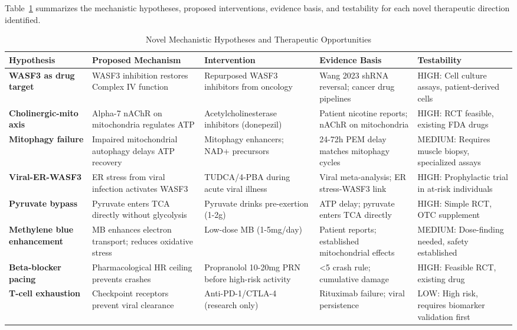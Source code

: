 Table~\ref{tab:novel-hypotheses-summary} summarizes the mechanistic hypotheses, proposed interventions, evidence basis, and testability for each novel therapeutic direction identified.

\begin{table}[htbp]
\centering
\caption{Novel Mechanistic Hypotheses and Therapeutic Opportunities}
\label{tab:novel-hypotheses-summary}
\scriptsize
\begin{tabular}{p{2.8cm}p{3cm}p{2.8cm}p{2.5cm}p{2.5cm}}
\toprule
\textbf{Hypothesis} & \textbf{Proposed Mechanism} & \textbf{Intervention} & \textbf{Evidence Basis} & \textbf{Testability} \\
\midrule
\textbf{WASF3 as drug target} & WASF3 inhibition restores Complex IV function & Repurposed WASF3 inhibitors from oncology & Wang 2023 shRNA reversal; cancer drug pipelines & HIGH: Cell culture assays, patient-derived cells \\
\midrule
\textbf{Cholinergic-mito axis} & Alpha-7 nAChR on mitochondria regulates ATP & Acetylcholinesterase inhibitors (donepezil) & Patient nicotine reports; nAChR on mitochondria & HIGH: RCT feasible, existing FDA drugs \\
\midrule
\textbf{Mitophagy failure} & Impaired mitochondrial autophagy delays ATP recovery & Mitophagy enhancers; NAD+ precursors & 24-72h PEM delay matches mitophagy cycles & MEDIUM: Requires muscle biopsy, specialized assays \\
\midrule
\textbf{Viral-ER-WASF3} & ER stress from viral infection activates WASF3 & TUDCA/4-PBA during acute viral illness & Viral meta-analysis; ER stress-WASF3 link & HIGH: Prophylactic trial in at-risk individuals \\
\midrule
\textbf{Pyruvate bypass} & Pyruvate enters TCA directly without glycolysis & Pyruvate drinks pre-exertion (1-2g) & ATP delay; pyruvate enters TCA directly & HIGH: Simple RCT, OTC supplement \\
\midrule
\textbf{Methylene blue enhancement} & MB enhances electron transport; reduces oxidative stress & Low-dose MB (1-5mg/day) & Patient reports; established mitochondrial effects & MEDIUM: Dose-finding needed, safety established \\
\midrule
\textbf{Beta-blocker pacing} & Pharmacological HR ceiling prevents crashes & Propranolol 10-20mg PRN before high-risk activity & <5 crash rule; cumulative damage & HIGH: Feasible RCT, existing drug \\
\midrule
\textbf{T-cell exhaustion} & Checkpoint receptors prevent viral clearance & Anti-PD-1/CTLA-4 (research only) & Rituximab failure; viral persistence & LOW: High risk, requires biomarker validation first \\

\end{tabular}
\end{table}
